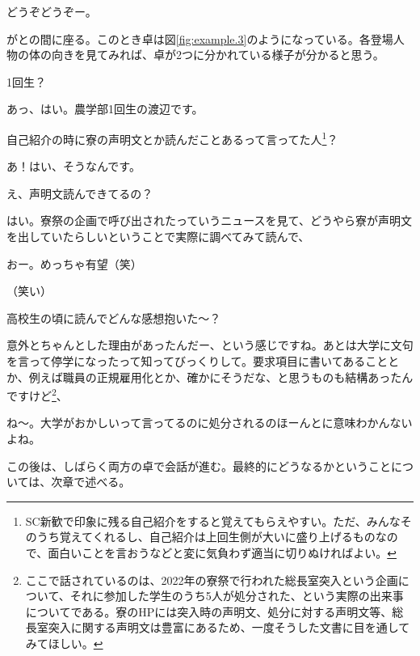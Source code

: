 \begin{multicols}{2}
どうぞどうぞー。

がとの間に座る。このとき卓は図\ref{fig:example.3}のようになっている。各登場人物の体の向きを見てみれば、卓が2つに分かれている様子が分かると思う。

1回生？

あっ、はい。農学部1回生の渡辺です。

自己紹介の時に寮の声明文とか読んだことあるって言ってた人\footnote{SC新歓で印象に残る自己紹介をすると覚えてもらえやすい。ただ、みんなそのうち覚えてくれるし、自己紹介は上回生側が大いに盛り上げるものなので、面白いことを言おうなどと変に気負わず適当に切りぬければよい。}？

あ！はい、そうなんです。

え、声明文読んできてるの？

はい。寮祭の企画で呼び出されたっていうニュースを見て、どうやら寮が声明文を出していたらしいということで実際に調べてみて読んで、

おー。めっちゃ有望（笑）

（笑い）

高校生の頃に読んでどんな感想抱いた～？

意外とちゃんとした理由があったんだー、という感じですね。あとは大学に文句を言って停学になったって知ってびっくりして。要求項目に書いてあることとか、例えば職員の正規雇用化とか、確かにそうだな、と思うものも結構あったんですけど\footnote{ここで話されているのは、2022年の寮祭で行われた総長室突入という企画について、それに参加した学生のうち5人が処分された、という実際の出来事についてである。寮のHPには突入時の声明文、処分に対する声明文等、総長室突入に関する声明文は豊富にあるため、一度そうした文書に目を通してみてほしい。}、

ね～。大学がおかしいって言ってるのに処分されるのほーんとに意味わかんないよね。

この後は、しばらく両方の卓で会話が進む。最終的にどうなるかということについては、次章で述べる。
\par
\dotfill


\end{multicols}
